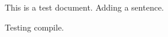 \documentclass{article}
\begin{document}
This is a test document.
Adding a sentence.

Testing compile.
\end{document}
